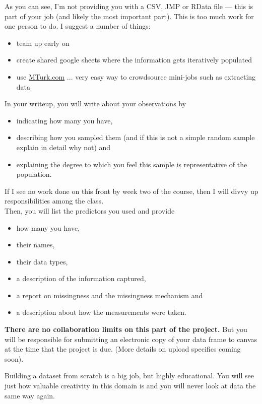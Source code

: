 \documentclass[12pt]{article}
\begin{document}
As you can see, I'm not providing you with a CSV, JMP or RData file --- this is part of your job (and likely the most important part). This is too much work for one person to do. I suggest a number of things:

\begin{itemize}
\item team up early on
\item create shared google sheets where the information gets iteratively populated
\item use \url{MTurk.com} ... very easy way to crowdsource mini-jobs such as extracting data
\end{itemize}

In your writeup, you will write about your observations by

\begin{itemize}
\item indicating how many you have,
\item describing how you sampled them (and if this is not a simple random sample explain in detail why not) and
\item explaining the degree to which you feel this sample is representative of the population.
\end{itemize}

\noindent If I see no work done on this front by week two of the course, then I will divvy up responsibilities among the class.\\

\noindent Then, you will list the predictors you used and provide

\begin{itemize}
\item how many you have,
\item their names,
\item their data types,
\item a description of the information captured,
\item a report on missingness and the missingness mechanism and
\item a description about how the measurements were taken.
\end{itemize}


\textbf{There are no collaboration limits on this part of the project.} But you will be responsible for submitting an electronic copy of your data frame to canvas at the time that the project is due. (More details on upload specifics coming soon).

Building a dataset from scratch is a big job, but highly educational. You will see just how valuable creativity in this domain is and you will never look at data the same way again.
\end{document}
